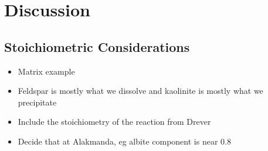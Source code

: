 

\section{Discussion}













\subsection{Stoichiometric Considerations}
\begin{itemize}
    \item Matrix example
    \item Feldspar is mostly what we dissolve and kaolinite is mostly what we precipitate
    \item Include the stoichiometry of the reaction from Drever
    \item Decide that at Alakmanda, eg albite component is near 0.8

\end{itemize}

